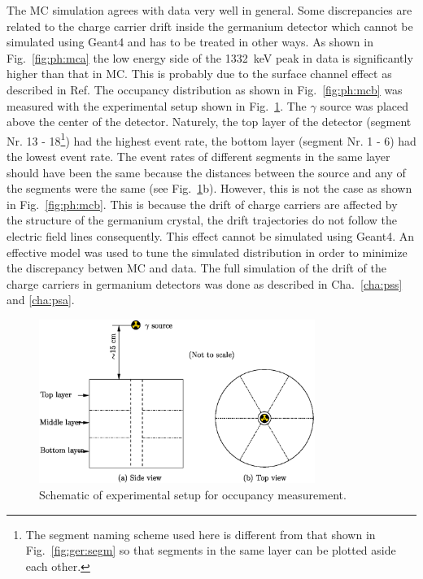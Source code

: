 The MC simulation agrees with data very well in general. Some discrepancies are related to the charge carrier drift inside the germanium detector which cannot be simulated using Geant4 and has to be treated in other ways. As shown in Fig.~\ref{fig:ph:mca} the low energy side of the 1332~keV peak in data is significantly higher than that in MC. This is probably due to the surface channel effect as described in Ref\cite{Sur05}. The occupancy distribution as shown in Fig.~\ref{fig:ph:mcb} was measured with the experimental setup shown in Fig.~\ref{fig:ph:occ}. The $\gamma$ source was placed above the center of the detector. Naturely, the top layer of the detector (segment Nr. 13 - 18\footnote{The segment naming scheme used here is different from that shown in Fig.~\ref{fig:ger:segm} so that segments in the same layer can be plotted aside each other.}) had the highest event rate, the bottom layer (segment Nr. 1 - 6) had the lowest event rate. The event rates of different segments in the same layer should have been the same because the distances between the source and any of the segments were the same (see Fig.~\ref{fig:ph:occ}b). However, this is not the case as shown in Fig.~\ref{fig:ph:mcb}. This is because the drift of charge carriers are affected by the structure of the germanium crystal, the drift trajectories do not follow the electric field lines consequently. This effect cannot be simulated using Geant4. An effective model was used to tune the simulated distribution in order to minimize the discrepancy betwen MC and data. The full simulation of the drift of the charge carriers in germanium detectors was done as described in Cha.~\ref{cha:pss} and \ref{cha:psa}.

\begin{figure}[htbp]
\centering
\includegraphics[width=0.8\textwidth]{occumea}
\caption{Schematic of experimental setup for occupancy measurement.}
\label{fig:ph:occ}
\end{figure}


